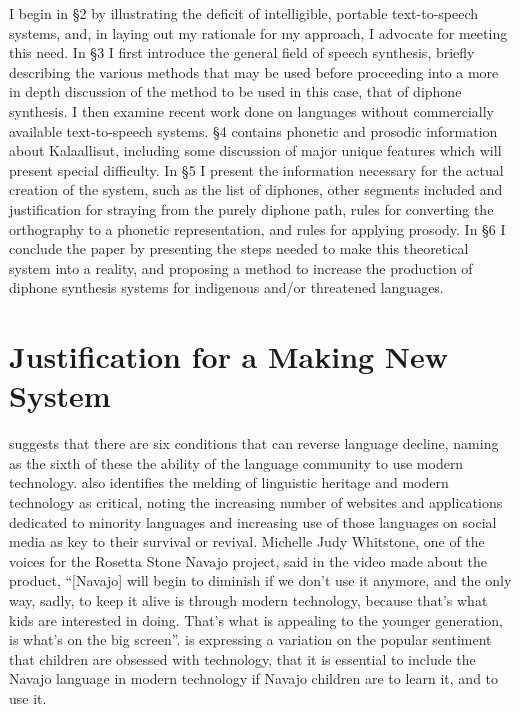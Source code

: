 \documentclass[12pt]{article}
\begin{document}
I begin in \S 2 by illustrating the deficit of intelligible, portable text-to-speech systems, and, in laying out my rationale for my approach, I advocate for meeting this need. In \S 3 I first introduce the general field of speech synthesis, briefly describing the various methods that may be used before proceeding into a more in depth discussion of the method to be used in this case, that of diphone synthesis. I then examine recent work done on languages without commercially available text-to-speech systems. \S 4 contains phonetic and prosodic information about Kalaallisut, including some discussion of major unique features which will present special difficulty. In \S 5 I present the information necessary for the actual creation of the system, such as the list of diphones, other segments included and justification for straying from the purely diphone path, rules for converting the orthography to a phonetic representation, and rules for applying prosody. In \S 6 I conclude the paper by presenting the steps needed to make this theoretical system into a reality, and proposing a method to increase the production of diphone synthesis systems for indigenous and/or threatened languages. \par

\section{Justification for a Making New System}

\citet{crystal} suggests that there are six conditions that can reverse language decline, naming as the sixth of these the ability of the language community to use modern technology. \citet{endng} also identifies the melding of linguistic heritage and modern technology as critical, noting the increasing number of websites and applications dedicated to minority languages and increasing use of those languages on social media as key to their survival or revival. Michelle Judy Whitstone, one of the voices for the Rosetta Stone Navajo project, said in the video made about the product, ``[Navajo] will begin to diminish if we don't use it anymore, and the only way, sadly, to keep it alive is through modern technology, because that's what kids are interested in doing. That's what is appealing to the younger generation, is what's on the big screen''. \citeauthor{rosetta} is expressing a variation on the popular sentiment that children are obsessed with technology, that it is essential to include the Navajo language in modern technology if Navajo children are to learn it, and to use it. \par
\end{document}

